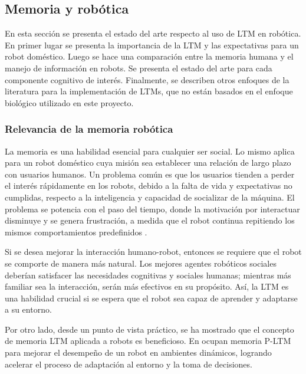  
\subsection{Memoria y robótica}
En esta sección se presenta el estado del arte respecto al uso de LTM en robótica. En primer lugar se presenta la importancia de la LTM y las expectativas para un robot doméstico. Luego se hace una comparación entre la memoria humana y el manejo de información en robots.  Se presenta el estado del arte para cada componente cognitivo de interés. Finalmente, se describen otros enfoques de la literatura para la implementación de LTMs, que no están basados en el enfoque biológico utilizado en este proyecto.


\subsubsection{Relevancia de la memoria robótica}
La memoria es una habilidad esencial para cualquier ser social. Lo mismo aplica para un robot doméstico cuya misión sea establecer una relación de largo plazo con usuarios humanos. Un problema común es que los usuarios tienden a perder el interés rápidamente en los robots, debido a la falta de vida y expectativas no cumplidas, respecto a la inteligencia y capacidad de socializar de la máquina. El problema se potencia con el paso del tiempo, donde la motivación por interactuar disminuye y se genera frustración, a medida que el robot continua repitiendo los mismos comportamientos predefinidos \cite{Ho2009}.

Si se desea mejorar la interacción humano-robot, entonces se requiere que el robot se comporte de manera más natural. Los mejores agentes robóticos sociales deberían satisfacer las necesidades cognitivas y sociales humanas; mientras más familiar sea la interacción, serán más efectivos en su propósito. Así, la LTM es una habilidad crucial si se espera que el robot sea capaz de aprender y adaptarse a su entorno.


Por otro lado, desde un punto de vista práctico, se ha mostrado que el concepto de memoria LTM aplicada a robots es beneficioso. En \cite{Salgado2012} ocupan memoria P-LTM para mejorar el desempeño de un robot en ambientes dinámicos, logrando acelerar el proceso de adaptación al entorno y la toma de decisiones.




